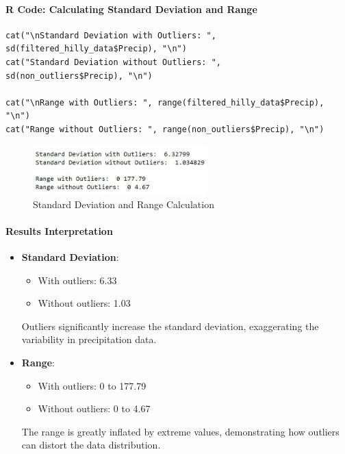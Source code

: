 \paragraph{R Code: Calculating Standard Deviation and Range}

\begin{verbatim}
cat("\nStandard Deviation with Outliers: ", 
sd(filtered_hilly_data$Precip), "\n")
cat("Standard Deviation without Outliers: ", 
sd(non_outliers$Precip), "\n")

cat("\nRange with Outliers: ", range(filtered_hilly_data$Precip), "\n")
cat("Range without Outliers: ", range(non_outliers$Precip), "\n")
\end{verbatim}

\begin{figure}[h]
\centering
\includegraphics[width=0.6\textwidth]{figures/sd_range.jpg}
\caption{Standard Deviation and Range Calculation}
\end{figure}

\paragraph{Results Interpretation}

\begin{itemize}
  \item \textbf{Standard Deviation}:
  \begin{itemize}
    \item With outliers: 6.33
    \item Without outliers: 1.03
  \end{itemize}
  Outliers significantly increase the standard deviation, exaggerating the variability in precipitation data.
  
  \item \textbf{Range}:
  \begin{itemize}
    \item With outliers: 0 to 177.79
    \item Without outliers: 0 to 4.67
  \end{itemize}
  The range is greatly inflated by extreme values, demonstrating how outliers can distort the data distribution.
\end{itemize}

